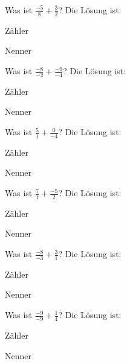 \documentclass{ximera}
\begin{document}
\begin{shuffle}
\begin{question}
Was ist $\frac{-5}{8} + \frac{3}{2}$?
Die Lösung ist:
\begin{solution}
Zähler 
\end{solution}
\begin{solution}
Nenner 
\end{solution}
\end{question}


\begin{question}
Was ist $\frac{-8}{-2} + \frac{-9}{-4}$?
Die Lösung ist:
\begin{solution}
Zähler 
\end{solution}
\begin{solution}
Nenner 
\end{solution}
\end{question}


\begin{question}
Was ist $\frac{5}{1} + \frac{0}{-4}$?
Die Lösung ist:
\begin{solution}
Zähler 
\end{solution}
\begin{solution}
Nenner 
\end{solution}
\end{question}


\begin{question}
Was ist $\frac{7}{1} + \frac{-5}{2}$?
Die Lösung ist:
\begin{solution}
Zähler 
\end{solution}
\begin{solution}
Nenner 
\end{solution}
\end{question}


\begin{question}
Was ist $\frac{-8}{-3} + \frac{3}{1}$?
Die Lösung ist:
\begin{solution}
Zähler 
\end{solution}
\begin{solution}
Nenner 
\end{solution}
\end{question}


\begin{question}
Was ist $\frac{-9}{-9} + \frac{1}{4}$?
Die Lösung ist:
\begin{solution}
Zähler 
\end{solution}
\begin{solution}
Nenner 
\end{solution}
\end{question}



\end{shuffle}
\end{document}
